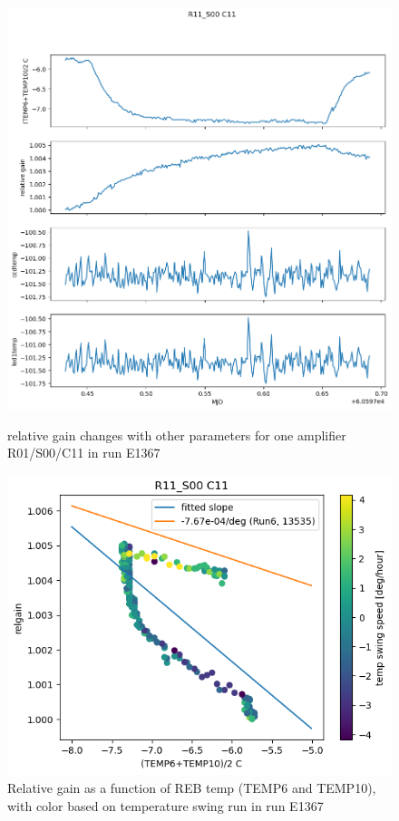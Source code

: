 \begin{figure}[htbp]
\centering
\begin{minipage}{0.45\textwidth}
    \centering
    \includegraphics[width=\textwidth]{figures/gaintemp/E1367RelgainParametersTrending.png}
    \caption{relative gain changes with other parameters for one amplifier R01/S00/C11 in run E1367}
    \label{fig:relgainparamE1367}
\end{minipage}
\hfill
\begin{minipage}{0.45\textwidth}
    \centering
    \includegraphics[width=\textwidth]{figures/gaintemp/E1367RelgainDetail.png}
    \caption{Relative gain as a function of REB temp (TEMP6 and TEMP10), with color based on temperature swing run  in run E1367}
    \label{fig:gaintempE1367}
\end{minipage}
\end{figure}

